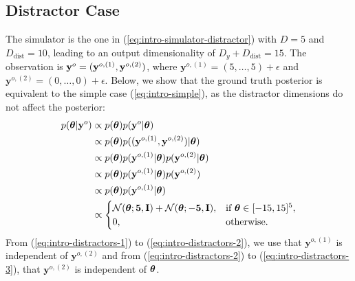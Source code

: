 \subsection{Distractor Case}

The simulator is the one in (\ref{eq:intro-simulator-distractor}) with $D = 5$ and $D_{\text{dist}} = 10$, leading to an output dimensionality of $D_y + D_{\text{dist}} = 15$.
The observation is $\mathbf{y}^o = (\mathbf{y}^{o,(1)}, \mathbf{y}^{o,(2)})$,
where
$\mathbf{y}^{o,(1)} = (5, \ldots, 5) + \epsilon$
and
$\mathbf{y}^{o,(2)} = (0, \ldots, 0) + \epsilon$.
Below, we show that the ground truth posterior is equivalent to the simple case (\ref{eq:intro-simple}), as the distractor dimensions do not affect the posterior:
%
\begin{align}
  p(\boldsymbol{\theta} | \mathbf{y}^o)
  &\propto p(\boldsymbol{\theta}) p(\mathbf{y}^o | \boldsymbol{\theta}) \\
  &\propto p(\boldsymbol{\theta}) p((\mathbf{y}^{o,(1)}, \mathbf{y}^{o,(2)}) | \boldsymbol{\theta}) \label{eq:intro-distractors-1} \\
  &\propto p(\boldsymbol{\theta}) p(\mathbf{y}^{o,(1)} | \boldsymbol{\theta}) p(\mathbf{y}^{o,(2)} | \boldsymbol{\theta}) \label{eq:intro-distractors-2} \\
  &\propto p(\boldsymbol{\theta}) p(\mathbf{y}^{o,(1)} | \boldsymbol{\theta}) p(\mathbf{y}^{o,(2)}) \label{eq:intro-distractors-3} \\
  &\propto p(\boldsymbol{\theta}) p(\mathbf{y}^{o,(1)} | \boldsymbol{\theta}) \\
  &\propto
  \begin{cases}
    \mathcal{N}(\boldsymbol{\theta}; \mathbf{5}, \mathbf{I}) + \mathcal{N}(\boldsymbol{\theta}; -\mathbf{5}, \mathbf{I}), & \text{if } \boldsymbol{\theta} \in [-15, 15]^5, \\
    0, & \text{otherwise}.
  \end{cases}
  \label{eq:intro-distractors}
\end{align}
%
From (\ref{eq:intro-distractors-1}) to (\ref{eq:intro-distractors-2}), we use that $\mathbf{y}^{o,(1)}$ is independent of $\mathbf{y}^{o,(2)}$ and
from (\ref{eq:intro-distractors-2}) to (\ref{eq:intro-distractors-3}), that $\mathbf{y}^{o,(2)}$ is independent of $\boldsymbol{\theta}$.

